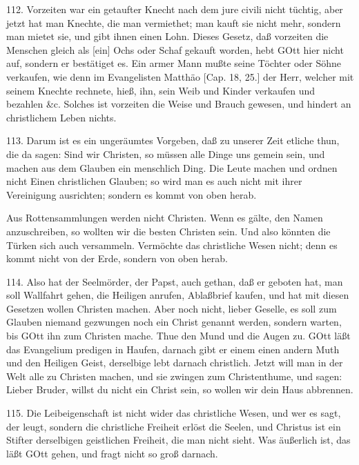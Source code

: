 112. Vorzeiten war ein getaufter Knecht nach dem jure civili nicht tüchtig, aber jetzt hat man Knechte, die man vermiethet; man kauft sie nicht mehr, sondern man mietet sie, und gibt ihnen einen Lohn. Dieses Gesetz, daß vorzeiten die Menschen gleich als [ein] Ochs oder Schaf gekauft worden, hebt GOtt hier nicht auf, sondern er bestätiget es. Ein armer Mann mußte seine Töchter oder Söhne verkaufen, wie denn im Evangelisten Matthäo [Cap. 18, 25.] der Herr, welcher mit seinem Knechte rechnete, hieß, ihn, sein Weib und Kinder verkaufen und bezahlen \&c. Solches ist vorzeiten die Weise und Brauch gewesen, und hindert an christlichem Leben nichts.

113. Darum ist es ein ungeräumtes Vorgeben, daß zu unserer Zeit etliche thun, die da sagen: Sind wir Christen, so müssen alle Dinge uns gemein sein, und machen aus dem Glauben ein menschlich Ding. Die Leute machen und ordnen nicht Einen christlichen Glauben; so wird man es auch nicht mit ihrer Vereinigung ausrichten; sondern es kommt von oben herab.

Aus Rottensammlungen werden nicht Christen. Wenn es gälte, den Namen anzuschreiben, so wollten wir die besten Christen sein. Und also könnten die Türken sich auch versammeln. Vermöchte das christliche Wesen nicht; denn es kommt nicht von der Erde, sondern von oben herab.

114. Also hat der Seelmörder, der Papst, auch gethan, daß er geboten hat, man soll Wallfahrt gehen, die Heiligen anrufen, Ablaßbrief kaufen, und hat mit diesen Gesetzen wollen Christen machen. Aber noch nicht, lieber Geselle, es soll zum Glauben niemand gezwungen noch ein Christ genannt werden, sondern warten, bis GOtt ihn zum Christen mache. Thue den Mund und die Augen zu. GOtt läßt das Evangelium predigen in Haufen, darnach gibt er einem einen andern Muth und den Heiligen Geist, derselbige lebt darnach christlich. Jetzt will man in der Welt alle zu Christen machen, und sie zwingen zum Christenthume, und sagen: Lieber Bruder, willst du nicht ein Christ sein, so wollen wir dein Haus abbrennen.

115. Die Leibeigenschaft ist nicht wider das christliche Wesen, und wer es sagt, der leugt, sondern die christliche Freiheit erlöst die Seelen, und Christus ist ein Stifter derselbigen geistlichen Freiheit, die man nicht sieht. Was äußerlich ist, das läßt GOtt gehen, und fragt nicht so groß darnach.

